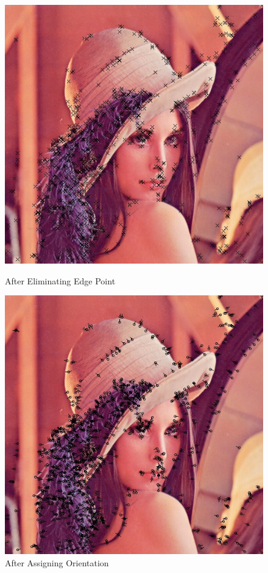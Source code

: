 \begin{enumerate}
\begin{figure}[H]
      \begin{minipage}[b]{0.46\linewidth}
        \centering
        \includegraphics[scale=0.4]{res/feature_point.png}
        \caption{After Eliminating Edge Point\label{fig:feature3}}
      \end{minipage}
      \hspace{1em}
      \begin{minipage}[b]{0.46\linewidth}
        \centering
        \includegraphics[scale=0.4]{res/feature_dir.png}
        \caption{After Assigning Orientation\label{fig:feature4}}
      \end{minipage}
    \end{figure}


\end{enumerate}
